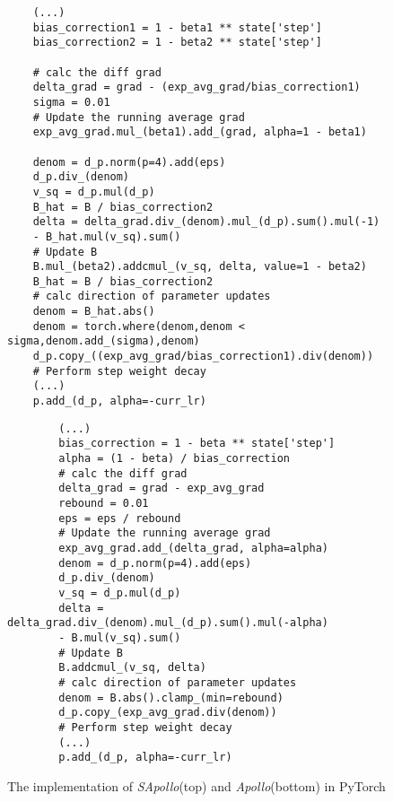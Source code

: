     \FloatBarrier
    \begin{figure}[H]
     \begin{verbatim}
    (...)
    bias_correction1 = 1 - beta1 ** state['step']
    bias_correction2 = 1 - beta2 ** state['step']

    # calc the diff grad
    delta_grad = grad - (exp_avg_grad/bias_correction1)
    sigma = 0.01
    # Update the running average grad
    exp_avg_grad.mul_(beta1).add_(grad, alpha=1 - beta1)

    denom = d_p.norm(p=4).add(eps)
    d_p.div_(denom)
    v_sq = d_p.mul(d_p)
    B_hat = B / bias_correction2
    delta = delta_grad.div_(denom).mul_(d_p).sum().mul(-1) 
    - B_hat.mul(v_sq).sum()
    # Update B
    B.mul_(beta2).addcmul_(v_sq, delta, value=1 - beta2)
    B_hat = B / bias_correction2
    # calc direction of parameter updates
    denom = B_hat.abs()
    denom = torch.where(denom,denom < sigma,denom.add_(sigma),denom)
    d_p.copy_((exp_avg_grad/bias_correction1).div(denom))
    # Perform step weight decay
    (...)
    p.add_(d_p, alpha=-curr_lr)
    \end{verbatim}
    \begin{verbatim}
        (...)
        bias_correction = 1 - beta ** state['step']
        alpha = (1 - beta) / bias_correction
        # calc the diff grad
        delta_grad = grad - exp_avg_grad
        rebound = 0.01
        eps = eps / rebound
        # Update the running average grad
        exp_avg_grad.add_(delta_grad, alpha=alpha)
        denom = d_p.norm(p=4).add(eps)
        d_p.div_(denom)
        v_sq = d_p.mul(d_p)
        delta = delta_grad.div_(denom).mul_(d_p).sum().mul(-alpha) 
        - B.mul(v_sq).sum()
        # Update B
        B.addcmul_(v_sq, delta)
        # calc direction of parameter updates
        denom = B.abs().clamp_(min=rebound)
        d_p.copy_(exp_avg_grad.div(denom))
        # Perform step weight decay
        (...)
        p.add_(d_p, alpha=-curr_lr)
        \end{verbatim}

    
        \caption{The implementation of \emph{SApollo}(top) and  \emph{Apollo}(bottom) in PyTorch}
        \label{fig:sapollo_imp}
    
        \end{figure}
        \FloatBarrier
    
